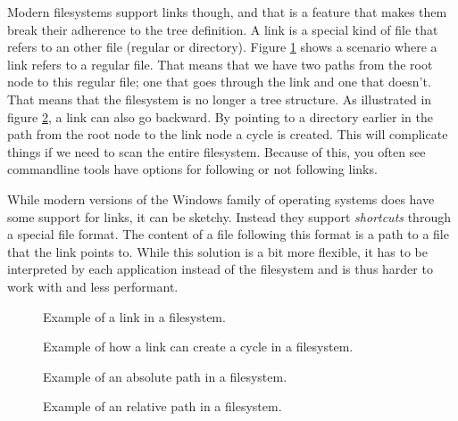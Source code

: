 Modern filesystems support links though, and that is a feature that makes them break their adherence to the tree definition. A link is a special kind of file that refers to an other file (regular or directory). Figure \ref{fig:bs:fs:links} shows a scenario where a link refers to a regular file. That means that we have two paths from the root node to this regular file; one that goes through the link and one that doesn't. That means that the filesystem is no longer a tree structure. As illustrated in figure \ref{fig:bs:fs:cycles}, a link can also go backward. By pointing to a directory earlier in the path from the root node to the link node a cycle is created. This will complicate things if we need to scan the entire filesystem. Because of this, you often see commandline tools have options for following or not following links.

While modern versions of the Windows family of operating systems does have some support for links, it can be sketchy. Instead they support \textsl{shortcuts} through a special  file format. The content of a file following this format is a path to a file that the link points to. While this solution is a bit more flexible, it has to be interpreted by each application instead of the filesystem and is thus harder to work with and less performant.

\begin{figure}[tbp]
  
  \caption{Example of a link in a filesystem.}
  \label{fig:bs:fs:links}
\end{figure}

\begin{figure}[tbp]
  
  \caption{Example of how a link can create a cycle in a filesystem.}
  \label{fig:bs:fs:cycles}
\end{figure}

\begin{figure}[tbp]
  
  \caption{Example of an absolute path in a filesystem.}
  \label{fig:bs:fs:path:abs}
\end{figure}

\begin{figure}[tbp]
  
  \caption{Example of an relative path in a filesystem.}
  \label{fig:bs:fs:path:rel}
\end{figure}


